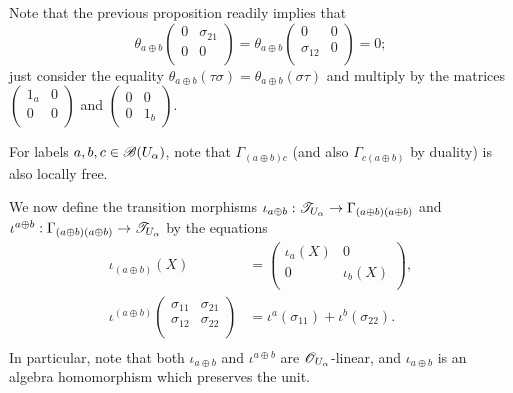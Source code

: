 \begin{obs}\label{remark_trace_sum}
Note that the previous proposition readily implies that
$$\theta_{a\oplus b}\left (\begin{smallmatrix} 0 & \sigma_{21} \\ 0 & 0 \\ \end{smallmatrix}\right )=\theta_{a\oplus b}\left (\begin{smallmatrix} 0 & 0 \\ \sigma_{12} & 0 \\ \end{smallmatrix}\right )=0;$$
just consider the equality $\theta_{a\oplus b}(\tau \sigma )=\theta_{a\oplus b}(\sigma \tau )$ and multiply by the matrices $\left (\begin{smallmatrix} 1_a & 0 \\ 0 & 0 \\ \end{smallmatrix}\right )$ and $\left (\begin{smallmatrix} 0 & 0 \\ 0 & 1_b \end{smallmatrix}\right )$.
\end{obs}

For labels $a,b,c\in \mathscr{B}(U_\alpha )$, note that $\Gamma_{(a\oplus b)c}$ (and also $\Gamma_{c(a\oplus b)}$ by duality) is also locally free.

We now define the transition morphisms $\iota_{a\oplus b}:\mathscr{T}_{U_\alpha }\to \Gamma_{(a\oplus b)(a\oplus b)}$ and $\iota^{a\oplus b}:\Gamma_{(a\oplus b)(a\oplus b)}\to \mathscr{T}_{U_\alpha }$ by the equations
\begin{equation}\label{transition_additive}
\begin{aligned}
\iota_{(a\oplus b)}(X) &= \left (\begin{smallmatrix} \iota_a(X) & 0 \\ 0 & \iota_b(X) \\ \end{smallmatrix} \right ), \\
\iota^{(a\oplus b)}\left (\begin{smallmatrix} \sigma_{11} & \sigma_{21} \\ \sigma_{12} & \sigma_{22} \\ \end{smallmatrix} \right ) &=\iota^a(\sigma_{11})+\iota^b(\sigma_{22}).\\
\end{aligned}
\end{equation}
In particular, note that both $\iota_{a\oplus b}$ and $\iota^{a\oplus b}$ are $\mathscr{O}_{U_\alpha }$-linear, and $\iota_{a\oplus b}$ is an algebra homomorphism which preserves the unit.

